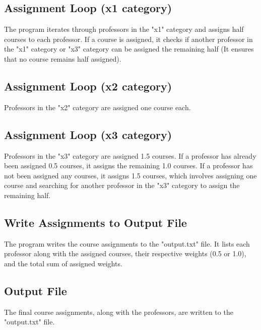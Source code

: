 \documentclass{article}
\begin{document}
\subsection*{Assignment Loop (x1 category)}
The program iterates through professors in the "x1" category and assigns half courses to each professor. If a course is assigned, it checks if another professor in the "x1" category or "x3" category can be assigned the remaining half (It ensures that no course remains half assigned).

\subsection*{Assignment Loop (x2 category)}
Professors in the "x2" category are assigned one course each.

\subsection*{Assignment Loop (x3 category)}
Professors in the "x3" category are assigned 1.5 courses. If a professor has already been assigned 0.5 courses, it assigns the remaining 1.0 courses. If a professor has not been assigned any courses, it assigns 1.5 courses, which involves assigning one course and searching for another professor in the "x3" category to assign the remaining half.

\subsection*{Write Assignments to Output File}
The program writes the course assignments to the "output.txt" file. It lists each professor along with the assigned courses, their respective weights (0.5 or 1.0), and the total sum of assigned weights.

\subsection*{Output File}
The final course assignments, along with the professors, are written to the "output.txt" file.
\end{document}
